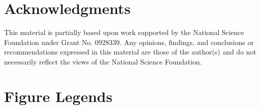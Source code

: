 \documentclass[10pt]{article}
\begin{document}
\section*{Acknowledgments}
This material is partially based upon work supported by the National Science
Foundation under Grant No. 0928339. Any opinions, findings, and conclusions or
recommendations expressed in this material are those of the author(s) and do
not necessarily reflect the views of the National Science Foundation.


\section*{Figure Legends}
\end{document}
